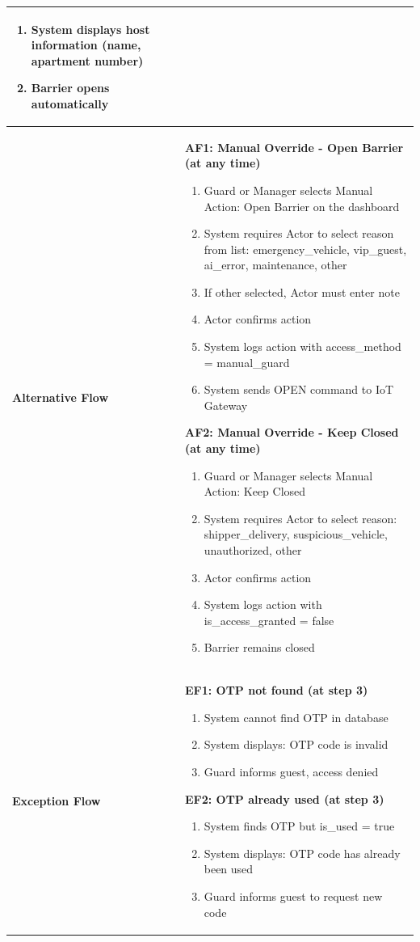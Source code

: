 \documentclass[a4paper]{article}
\newlength{\ucLeft}
\begin{document}
\begin{longtable}{|>{\bfseries}p{\ucLeft}|
                p{\dimexpr\textwidth-\ucLeft-4\tabcolsep-3\arrayrulewidth\relax}|}
\begin{enumerate}[leftmargin=*, nosep, topsep=0pt, partopsep=0pt, parsep=0pt]
    \item System displays host information (name, apartment number)
    \item Barrier opens automatically
\end{enumerate}
\\ \hline
Alternative Flow &
\noindent \textbf{AF1: Manual Override - Open Barrier (at any time)}
\begin{enumerate}
    \item Guard or Manager selects Manual Action: Open Barrier on the dashboard
    \item System requires Actor to select reason from list: emergency\_vehicle, vip\_guest, ai\_error, maintenance, other
    \item If other selected, Actor must enter note
    \item Actor confirms action
    \item System logs action with access\_method = manual\_guard
    \item System sends OPEN command to IoT Gateway
\end{enumerate}
\noindent \textbf{AF2: Manual Override - Keep Closed (at any time)}
\begin{enumerate}
    \item Guard or Manager selects Manual Action: Keep Closed
    \item System requires Actor to select reason: shipper\_delivery, suspicious\_vehicle, unauthorized, other
    \item Actor confirms action
    \item System logs action with is\_access\_granted = false
    \item Barrier remains closed
\end{enumerate}
\\ \hline
Exception Flow &
\noindent \textbf{EF1: OTP not found (at step 3)}
\begin{enumerate}
    \item System cannot find OTP in database
    \item System displays: OTP code is invalid
    \item Guard informs guest, access denied
\end{enumerate}

\noindent \textbf{EF2: OTP already used (at step 3)}
\begin{enumerate}
    \item System finds OTP but is\_used = true
    \item System displays: OTP code has already been used
    \item Guard informs guest to request new code
\end{enumerate}


\end{longtable}
\end{document}

